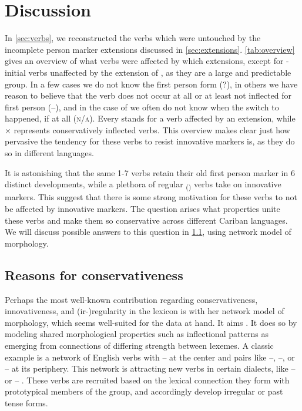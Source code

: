 \section{Discussion}
\label{sec:discussion}
In \cref{sec:verbs}, we reconstructed the verbs which were untouched by the incomplete person marker extensions discussed in \cref{sec:extensions}.
\cref{tab:overview} gives an overview of what verbs were affected by which extensions, except for -initial \akuriyo verbs unaffected by the extension of , as they are a large and predictable group.
In a few cases we do not know the first person form (?), in others we have reason to believe that the verb does not occur at all or at least not inflected for first person (–), and in the case of  we often do not know when the switch to  happened, if at all (\textsc{n/a}).
Every \checkmark stands for a verb affected by an extension, while × represents conservatively inflected verbs.
This overview makes clear just how pervasive the tendency for these verbs to resist innovative markers is, as they do so in different languages.



It is astonishing that the same 1-7 verbs retain their old first person marker in 6 distinct developments, while a plethora of regular \textsubscript{()} verbs take on innovative markers.
This suggest that there is some strong motivation for these verbs to not be affected by innovative markers.
The question arises what properties unite these verbs and make them so conservative across different Cariban languages.
We will discuss possible answers to this question in \cref{sec:motivations}, using  network model of morphology.

\subsection{Reasons for conservativeness}
\label{sec:motivations}
Perhaps the most well-known contribution regarding conservativeness, innovativeness, and (ir-){}re\-gu\-la\-ri\-ty in the lexicon is \textcite{bybee1985morphology} with her network model of morphology, which seems well-suited for the data at hand.
It aims  \parencite[428]{bybee1995regular}.
It does so by modeling shared morphological properties such as inflectional patterns as emerging from connections of differing strength between lexemes.
A classic example is a network of  English verbs with -- at the center and pairs like --, --, or -- at its periphery.
This network is attracting new verbs in certain dialects, like -- or -- \parencite[129--130]{bybee1985morphology}.
These verbs are recruited based on the lexical connection they form with prototypical members of the group, and accordingly develop irregular or  past tense forms.

